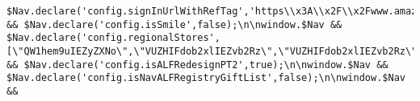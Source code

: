 \documentclass[
]{article}
\begin{document}
\begin{verbatim}
$Nav.declare('config.signInUrlWithRefTag','https\\x3A\\x2F\\x2Fwww.amazon.com\\x2Fap\\x2Fsignin\\x3Fopenid.pape.max_auth_age\\x3D0\\x26openid.return_to\\x3Dhttps\\x253A\\x252F\\x252Fwww.amazon.com\\x252FBest\\x2DSellers\\x2DElectronics\\x252Fzgbs\\x252Felectronics\\x252Fref\\x253Dzg_bs_nav_0\\x252F\\x253F_encoding\\x253DUTF8\\x2526ref_\\x253DnavSignInUrlRefTagPlaceHolder\\x26openid.identity\\x3Dhttp\\x253A\\x252F\\x252Fspecs.openid.net\\x252Fauth\\x252F2.0\\x252Fidentifier_select\\x26openid.assoc_handle\\x3Dusflex\\x26openid.mode\\x3Dcheckid_setup\\x26openid.claimed_id\\x3Dhttp\\x253A\\x252F\\x252Fspecs.openid.net\\x252Fauth\\x252F2.0\\x252Fidentifier_select\\x26openid.ns\\x3Dhttp\\x253A\\x252F\\x252Fspecs.openid.net\\x252Fauth\\x252F2.0\\x26');\n\nwindow.$Nav && $Nav.declare('config.isSmile',false);\n\nwindow.$Nav && $Nav.declare('config.regionalStores',[\"QW1hem9uIEZyZXNo\",\"VUZHIFdob2xlIEZvb2Rz\",\"VUZHIFdob2xlIEZvb2Rz\",\"VUZHIFdob2xlIEZvb2Rz\"]);\n\nwindow.$Nav && $Nav.declare('config.isALFRedesignPT2',true);\n\nwindow.$Nav && $Nav.declare('config.isNavALFRegistryGiftList',false);\n\nwindow.$Nav && 
\end{verbatim}
\end{document}
